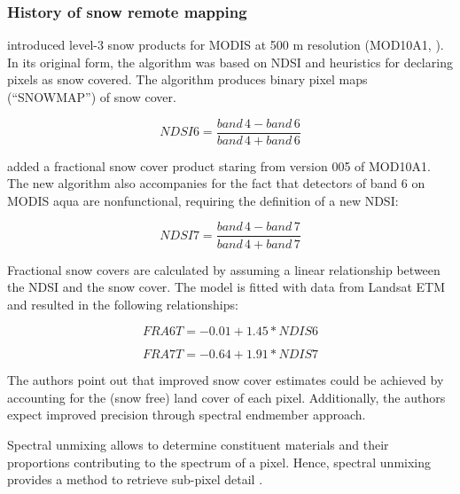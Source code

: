 \documentclass[a4paper,10pt]{article}
\begin{document}


\subsubsection{History of snow remote mapping}
\cite{Kharlamova2015, Hall2001} introduced level-3 snow products for \gls{MODIS} at 500 m resolution (MOD10A1, \cite{Hall2016}). In its original form, the algorithm was based on \gls{NDSI} and heuristics for declaring pixels as snow covered. The algorithm produces binary pixel maps (``SNOWMAP'') of snow cover.

\begin{equation}
 NDSI6 = \frac{band \, 4 -band \, 6}{band \, 4 + band \, 6}
\end{equation}

\cite{Salomonson2006, Salomonson2004} added a fractional snow cover product staring from version 005 of MOD10A1. The new algorithm also accompanies for the fact that detectors of band 6 on \gls{MODIS} aqua are nonfunctional, requiring the definition of a new \gls{NDSI}:

\begin{equation}
 NDSI7 = \frac{band \, 4 -band \, 7}{band \, 4 + band \, 7}
\end{equation}

Fractional snow covers are calculated by assuming a linear relationship between the NDSI and the snow cover. The model is fitted with data from Landsat ETM and resulted in the following relationships:

\begin{equation}
    FRA6T = -0.01 + 1.45 * NDIS6
\end{equation}

\begin{equation}
    FRA7T = -0.64 + 1.91 * NDIS7
\end{equation}

The authors point out that improved snow cover estimates could be achieved by accounting for the (snow free) land cover of each pixel. Additionally, the authors expect improved precision through spectral endmember approach. 

Spectral unmixing allows to determine constituent materials and their proportions contributing to the spectrum of a pixel. Hence, spectral unmixing provides a method to retrieve sub-pixel detail \citep{Keshava2003}. 
\end{document}
